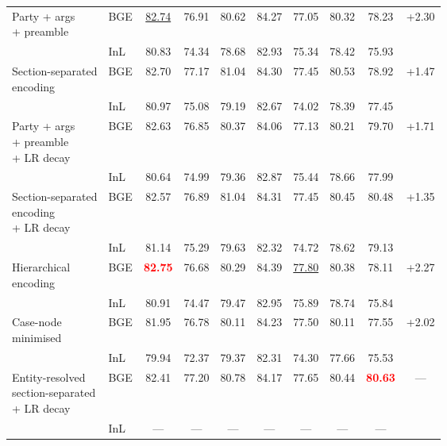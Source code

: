 \documentclass[runningheads]{llncs}
\newcommand{\best}[1]{\textbf{\textcolor{red}{#1}}}
\newcommand{\second}[1]{\underline{#1}}
\newcommand{\NA}{---}
\begin{document}
\begin{table}[!htbp]
\begin{adjustbox}{max width=\textwidth}
\begin{tabular}{p{2.75cm} l ccccc>{\columncolor{gray!10}}c c c}
\makecell[l]{Party + args\\+ preamble}
 & BGE & \second{82.74} & 76.91 & 80.62 & 84.27 & 77.05 & 80.32 & 78.23 & \multirow{2}{*}{+2.30}\\
 & InL & 80.83 & 74.34 & 78.68 & 82.93 & 75.34 & 78.42 & 75.93 & \\
\midrule

\makecell[l]{Section-separated\\encoding}
 & BGE & 82.70 & 77.17 & 81.04 & 84.30 & 77.45 & 80.53 & 78.92 & \multirow{2}{*}{+1.47}\\
 & InL & 80.97 & 75.08 & 79.19 & 82.67 & 74.02 & 78.39 & 77.45 & \\
\midrule

\makecell[l]{Party + args\\+ preamble\\+ LR decay}
 & BGE & 82.63 & 76.85 & 80.37 & 84.06 & 77.13 & 80.21 & 79.70 & \multirow{2}{*}{+1.71}\\
 & InL & 80.64 & 74.99 & 79.36 & 82.87 & 75.44 & 78.66 & 77.99 & \\
\midrule

\makecell[l]{Section-separated\\encoding\\+ LR decay}
 & BGE & 82.57 & 76.89 & 81.04 & 84.31 & 77.45 & 80.45 & 80.48 & \multirow{2}{*}{+1.35}\\
 & InL & 81.14 & 75.29 & 79.63 & 82.32 & 74.72 & 78.62 & 79.13 & \\
\midrule

\makecell[l]{Hierarchical\\encoding}
 & BGE & \best{82.75} & 76.68 & 80.29 & 84.39 & \second{77.80} & 80.38 & 78.11 & \multirow{2}{*}{+2.27}\\
 & InL & 80.91 & 74.47 & 79.47 & 82.95 & 75.89 & 78.74 & 75.84 & \\
\midrule

\makecell[l]{Case-node\\minimised}
 & BGE & 81.95 & 76.78 & 80.11 & 84.23 & 77.50 & 80.11 & 77.55 & \multirow{2}{*}{+2.02}\\
 & InL & 79.94 & 72.37 & 79.37 & 82.31 & 74.30 & 77.66 & 75.53 & \\
\midrule

\makecell[l]{Entity-resolved\\section-separated\\+ LR decay}
 & BGE & 82.41 & 77.20 & 80.78 & 84.17 & 77.65 & 80.44 & \best{80.63} & \multirow{2}{*}{\NA}\\
 & InL & \NA & \NA & \NA & \NA & \NA & \NA & \NA & \\
\midrule


\end{tabular}
\end{adjustbox}
\end{table}
\end{document}
